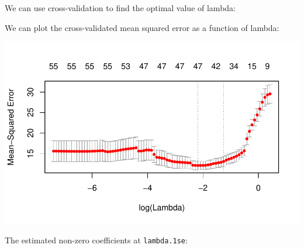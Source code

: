 \documentclass[12pt,letter]{article}\usepackage[]{graphicx}\usepackage[]{color}
\newenvironment{knitrout}{}{} %
\begin{document}
We can use cross-validation to find the optimal value of lambda:



We can plot the cross-validated mean squared error as a function of lambda:

\begin{knitrout}\scriptsize
{}\color{fgcolor}

{\centering \includegraphics[width=1\linewidth]{figure/sail-plot-cv-design-1} 

}



\end{knitrout}


The estimated non-zero coefficients at \texttt{lambda.1se}:
\end{document}
